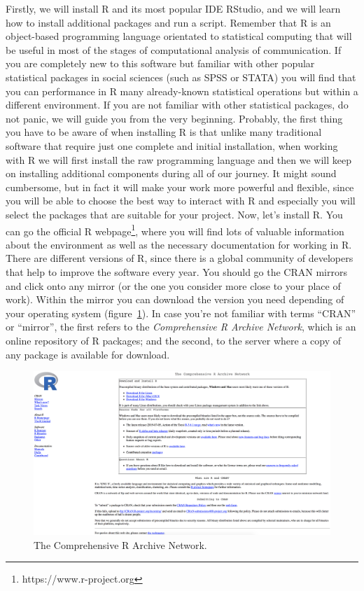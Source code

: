Firstly, we will install R and its most popular IDE RStudio, and we will learn how to install additional packages and run a script. Remember that R is an object-based programming language orientated to statistical computing that will be useful in most of the stages of computational analysis of communication.  If you are completely new to this software but familiar with other popular statistical packages in social sciences (such as SPSS or STATA) you will find that you can performance in R many already-known statistical operations but within a different environment. If you are not familiar with other statistical packages, do not panic, we will guide you from the very beginning. Probably, the first thing you have to be aware of when installing R is that unlike many traditional software that require just one complete and initial installation, when working with R we will first install the raw programming language and then we will keep on installing additional components during all of our journey. It might sound cumbersome, but in fact it will make your work more powerful and flexible, since you will be able to choose the best way to interact with R and especially you will select the packages that are suitable for your project.
Now, let's install R. You can go the official R webpage\footnote{https://www.r-project.org}, where you will find lots of valuable information about the environment as well as the necessary documentation for working in R.  There are different versions of R, since there is a global community of developers that help to improve the software every year. You should go the CRAN mirrors and click onto any mirror (or the one you consider more close to your place of work). Within the mirror you can download the version you need depending of your operating system (figure~\ref{fig:cran}). In case you're not familiar with terms “CRAN” or “mirror”, the first refers to the \textit{Comprehensive R Archive Network}, which is an online repository of R packages; and the second, to the server where a copy of any package is available for download.

\begin{figure}
\centering
\includegraphics[width=0.9\linewidth]{figures/ch3_cran}
\caption{The Comprehensive R Archive Network.}
\label{fig:cran}
\end{figure}

